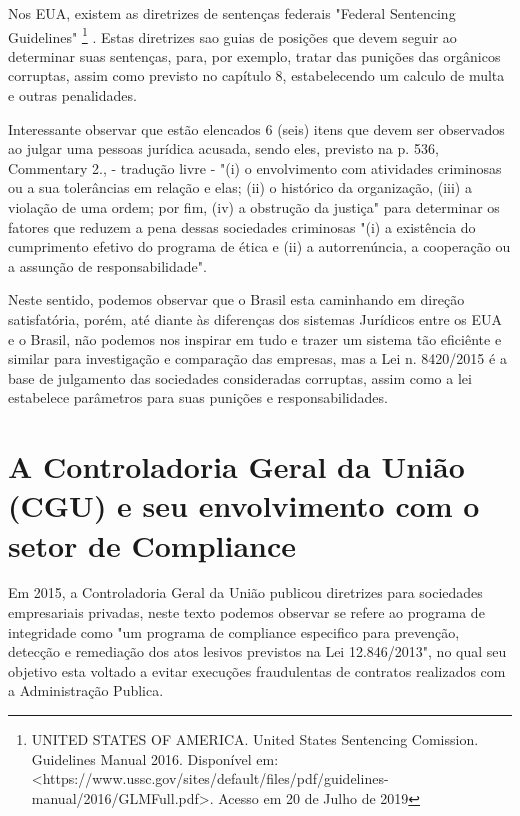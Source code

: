Nos EUA, existem as diretrizes de sentenças federais "Federal Sentencing Guidelines" \footnote{UNITED STATES OF AMERICA. United States Sentencing Comission. Guidelines Manual 2016. Disponível em: <https://www.ussc.gov/sites/default/files/pdf/guidelines-manual/2016/GLMFull.pdf>. Acesso em 20 de Julho de 2019} \cite{Guidelines}. Estas diretrizes sao guias de posições que devem seguir ao determinar suas sentenças, para, por exemplo, tratar das punições das orgânicos corruptas, assim como previsto no capítulo 8, estabelecendo um calculo de multa e outras penalidades. 

Interessante observar que estão elencados 6 (seis) itens que devem ser observados ao julgar uma pessoas jurídica acusada, sendo eles, previsto na \cite{Guidelines} p. 536, Commentary 2., - tradução livre - "(i) o envolvimento com atividades criminosas ou a sua tolerâncias em relação e elas; (ii) o histórico da organização, (iii) a violação de uma ordem; por fim, (iv) a obstrução da justiça" para determinar os fatores que reduzem a pena dessas sociedades criminosas "(i) a existência do cumprimento efetivo do programa de ética e (ii) a autorrenúncia, a cooperação ou a assunção de responsabilidade".

Neste sentido, podemos observar que o Brasil esta caminhando em direção satisfatória, porém, até diante às diferenças dos sistemas Jurídicos entre os EUA e o Brasil, não podemos nos inspirar em tudo e trazer um sistema tão eficiênte e similar para investigação e comparação das empresas, mas a Lei n. 8420/2015 é a base de julgamento das sociedades consideradas corruptas, assim como a lei estabelece parâmetros para suas punições e responsabilidades.

\section{A Controladoria Geral da União (CGU) e seu envolvimento com o setor de Compliance}

Em 2015, a Controladoria Geral da União publicou diretrizes para sociedades empresariais privadas, neste texto \cite{CGUProgramadeIntegridade} podemos observar se refere ao programa de integridade como "um programa de compliance especifico para prevenção, detecção e remediação dos atos lesivos previstos na Lei 12.846/2013", no qual seu objetivo esta voltado a evitar execuções fraudulentas de contratos realizados com a Administração Publica.


